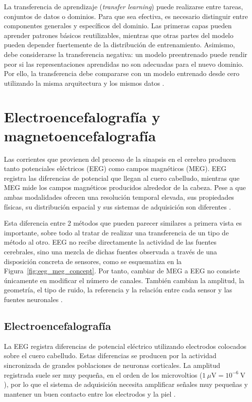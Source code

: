 La transferencia de aprendizaje (\textit{transfer learning}) puede realizarse entre tareas, conjuntos de datos o dominios. Para que sea efectiva, es necesario distinguir entre componentes generales y específicos del dominio. Las primeras capas pueden aprender patrones básicos reutilizables, mientras que otras partes del modelo pueden depender fuertemente de la distribución de entrenamiento. Asimismo, debe considerarse la transferencia negativa: un modelo preentrenado puede rendir peor si las representaciones aprendidas no son adecuadas para el nuevo dominio. Por ello, la transferencia debe compararse con un modelo entrenado desde cero utilizando la misma arquitectura y los mismos datos \cite{pan2010transfer}.

\section{Electroencefalografía y magnetoencefalografía}

Las corrientes que provienen del proceso de la sinapsis en el cerebro producen tanto potenciales eléctricos (EEG) como campos magnéticos (MEG). EEG registra las diferencias de potencial que llegan al cuero cabelludo, mientras que MEG mide los campos magnéticos producidos alrededor de la cabeza. Pese a que ambas modalidades ofrecen una resolución temporal elevada, sus propiedades físicas, su distribución espacial y sus sistemas de adquisición son diferentes \cite{hamalainen1993meg,gross2013meg}.

Esta diferencia entre 2 métodos que pueden parecer similares a primera vista es importante, sobre todo al tratar de realizar una transferencia de un tipo de método al otro. EEG no recibe directamente la actividad de las fuentes cerebrales, sino una mezcla de dichas fuentes observada a través de una disposición concreta de sensores, como se esquematiza en la Figura~\ref{fig:eeg_meg_concept}. Por tanto, cambiar de MEG a EEG no consiste únicamente en modificar el número de canales. También cambian la amplitud, la geometría, el tipo de ruido, la referencia y la relación entre cada sensor y las fuentes neuronales \cite{hamalainen1993meg,gross2013meg}.



\subsection{Electroencefalografía}

La EEG registra diferencias de potencial eléctrico utilizando electrodos colocados sobre el cuero cabelludo. Estas diferencias se producen por la actividad sincronizada de grandes poblaciones de neuronas corticales. La amplitud registrada suele ser muy pequeña, en el orden de los microvoltios (\(1~\mu\mathrm{V}=10^{-6}~\mathrm{V}\)), por lo que el sistema de adquisición necesita amplificar señales muy pequeñas y mantener un buen contacto entre los electrodos y la piel \cite{hamalainen1993meg}.

